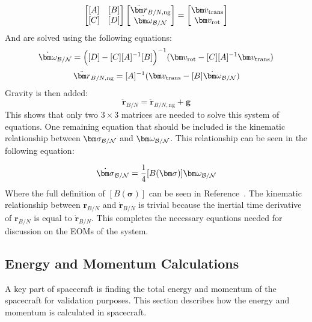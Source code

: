 \begin{equation}
\begin{bmatrix}
[A] & [B]\\
[C] & [D]
\end{bmatrix} \begin{bmatrix}
\ddot{\bm r}_{B/N,\text{ng}}\\
\dot{\bm\omega}_{\cal B/N}
\end{bmatrix} = \begin{bmatrix}
\bm v_{\text{trans}}\\
\bm v_{\text{rot}}
\end{bmatrix}
\label{eq:backSub}
\end{equation}
And are solved using the following equations:
\begin{equation}
\dot{\bm\omega}_{\cal B/N} = \Big([D] - [C][A]^{-1}[B]\Big)^{-1}(\bm v_{\text{rot}} - [C][A]^{-1}\bm v_{\text{trans}})
\end{equation}
\begin{equation}
\ddot{\bm r}_{B/N,\text{ng}} = [A]^{-1} (\bm v_{\text{trans}} - [B]\dot{\bm\omega}_{\cal B/N})
\end{equation}
Gravity is then added:
\begin{equation}
\ddot{\bm r}_{B/N} = \ddot{\bm r}_{B/N,\text{ng}} + \bm g
\end{equation}
This shows that only two $3\times 3$ matrices are needed to solve this system of equations. One remaining equation that should be included is the kinematic relationship between $\bm \sigma_{\cal{B}/\cal{N}}$ and $\bm \omega_{\cal{B}/\cal{N}}$. This relationship can be seen in the following equation:

\begin{equation}
\dot{\bm \sigma}_{\cal{B}/\cal{N}} = \frac{1}{4} [B(\bm \sigma)]\bm \omega_{\cal{B}/\cal{N}}
\end{equation}
Where the full definition of $[B(\bm \sigma)]$ can be seen in Reference~\cite{schaub}. The kinematic relationship between $\bm r_{B/N}$ and $\dot{\bm r}_{B/N}$ is trivial because the inertial time derivative of $\bm r_{B/N}$ is equal to $\dot{\bm r}_{B/N}$. This completes the necessary equations needed for discussion on the EOMs of the system.

\subsection{Energy and Momentum Calculations}

A key part of spacecraft is finding the total energy and momentum of the spacecraft for validation purposes. This section describes how the energy and momentum is calculated in spacecraft.

